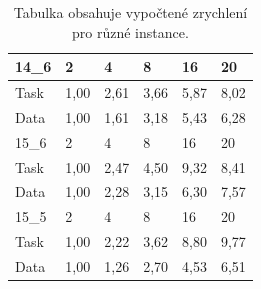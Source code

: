 \documentclass{article}%
\begin{document}
\begin{table}[]
    \begin{tabular}{l|lllll}
        14\_6 & 2    & 4    & 8    & 16   & 20   \\ \hline
        Task  & 1,00 & 2,61 & 3,66 & 5,87 & 8,02 \\
        Data  & 1,00 & 1,61 & 3,18 & 5,43 & 6,28 \\ \hline
        15\_6 & 2    & 4    & 8    & 16   & 20   \\ \hline
        Task  & 1,00 & 2,47 & 4,50 & 9,32 & 8,41 \\
        Data  & 1,00 & 2,28 & 3,15 & 6,30 & 7,57 \\ \hline
        15\_5 & 2    & 4    & 8    & 16   & 20   \\ \hline
        Task  & 1,00 & 2,22 & 3,62 & 8,80 & 9,77 \\
        Data  & 1,00 & 1,26 & 2,70 & 4,53 & 6,51
    \end{tabular}
    \caption{Tabulka obsahuje vypočtené zrychlení pro různé instance.}
\end{table}
\end{document}
